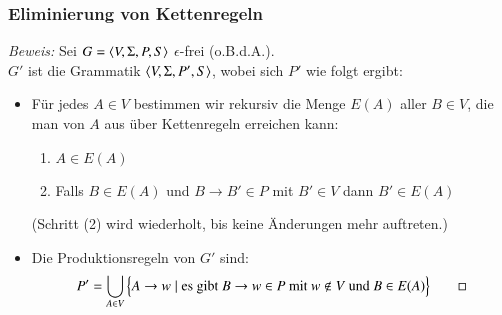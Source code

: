 \documentclass[onlymath]{beamer}
\begin{document}
\begin{frame}\frametitle{Eliminierung von Kettenregeln}

\bigskip
\pause

\pause

\emph{Beweis:} Sei $G=\langle{V,\Sigma,P,S}\rangle$ $\epsilon$-frei (o.B.d.A.).\\$G'$ ist die Grammatik $\langle{V,\Sigma,P',S}\rangle$, wobei sich $P'$ wie folgt ergibt: %

\begin{itemize}
\item Für jedes $A\in V$ bestimmen wir rekursiv die Menge $E(A)$ aller $B\in V$, die man von $A$ aus über Kettenregeln erreichen kann:
\begin{enumerate}[(1)]
\item $A\in E(A)$
\item Falls $B\in E(A)$ und $B\to B'\in P$ mit $B'\in V$ dann $B'\in E(A)$
\end{enumerate}
{\footnotesize(Schritt (2) wird wiederholt, bis keine Änderungen mehr auftreten.)}
\item Die Produktionsregeln von $G'$ sind:
 \[P' = \bigcup_{A\in V}\Big\{ A\to w\mid \text{es gibt }B\to w\in P\text{ mit }w\notin V\text{ und }B\in E(A)\Big\}\qed\]
\end{itemize}


\end{frame}
\end{document}
